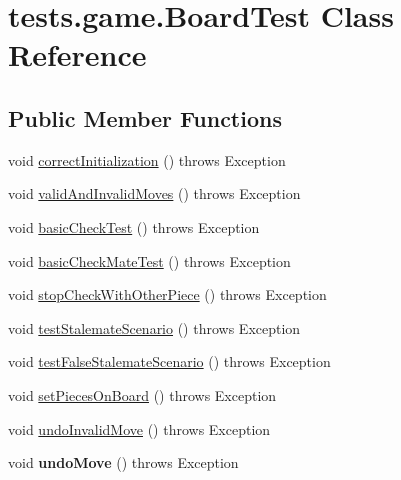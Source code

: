 \hypertarget{classtests_1_1game_1_1_board_test}{}\section{tests.\+game.\+Board\+Test Class Reference}
\label{classtests_1_1game_1_1_board_test}
\subsection*{Public Member Functions}
\begin{DoxyCompactItemize}
\item 
void \hyperlink{classtests_1_1game_1_1_board_test_a6c94dc8abd281e03634c14adff394806}{correct\+Initialization} ()  throws Exception 
\item 
void \hyperlink{classtests_1_1game_1_1_board_test_a469dc94630f0ed4e98bb43ca330902d3}{valid\+And\+Invalid\+Moves} ()  throws Exception 
\item 
void \hyperlink{classtests_1_1game_1_1_board_test_a8362cde481d6f3dc37d1dcddc2bd9bd6}{basic\+Check\+Test} ()  throws Exception 
\item 
void \hyperlink{classtests_1_1game_1_1_board_test_a5c217ac733bd460abcff4389a1ae09b4}{basic\+Check\+Mate\+Test} ()  throws Exception 
\item 
void \hyperlink{classtests_1_1game_1_1_board_test_aa129ae9e125061904fdf6ae16ddf8d40}{stop\+Check\+With\+Other\+Piece} ()  throws Exception 
\item 
void \hyperlink{classtests_1_1game_1_1_board_test_a49e4adc799868b9e82bfc217f4d569d8}{test\+Stalemate\+Scenario} ()  throws Exception 
\item 
void \hyperlink{classtests_1_1game_1_1_board_test_aafeeee28a08b09f5fee754f011ff05b1}{test\+False\+Stalemate\+Scenario} ()  throws Exception 
\item 
void \hyperlink{classtests_1_1game_1_1_board_test_afa846288b3dabd6963930c3c230a9fd5}{set\+Pieces\+On\+Board} ()  throws Exception 
\item 
void \hyperlink{classtests_1_1game_1_1_board_test_a3c6f4adbcc19328a3897be2e54f49e80}{undo\+Invalid\+Move} ()  throws Exception 
\item 
\hypertarget{classtests_1_1game_1_1_board_test_a0591d420470c4b8ce0230bd45cc30dfc}{}\label{classtests_1_1game_1_1_board_test_a0591d420470c4b8ce0230bd45cc30dfc} 
void {\bfseries undo\+Move} ()  throws Exception 
\end{DoxyCompactItemize}


